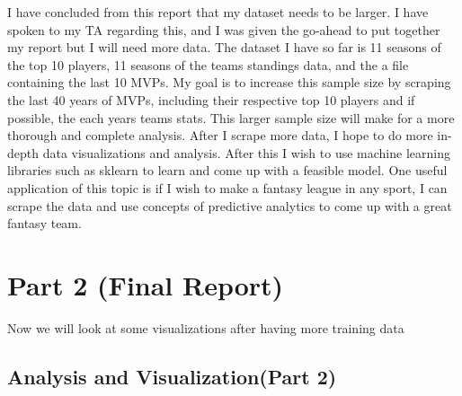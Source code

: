 \documentclass[11pt]{article}
\begin{document}
I have concluded from this report that my dataset needs to be larger. I
have spoken to my TA regarding this, and I was given the go-ahead to put
together my report but I will need more data. The dataset I have so far
is 11 seasons of the top 10 players, 11 seasons of the teams standings
data, and the a file containing the last 10 MVPs. My goal is to increase
this sample size by scraping the last 40 years of MVPs, including their
respective top 10 players and if possible, the each years teams stats.
This larger sample size will make for a more thorough and complete
analysis. After I scrape more data, I hope to do more in-depth data
visualizations and analysis. After this I wish to use machine learning
libraries such as sklearn to learn and come up with a feasible model.
One useful application of this topic is if I wish to make a fantasy
league in any sport, I can scrape the data and use concepts of
predictive analytics to come up with a great fantasy team.

    \section{Part 2 (Final Report)}\label{part-2-final-report}

    Now we will look at some visualizations after having more training data

\subsection{\texorpdfstring{Analysis and Visualization(Part 2)
}{Analysis and Visualization(Part 2)   }}\label{analysis-and-visualizationpart-2}
\end{document}
